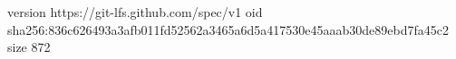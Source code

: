 version https://git-lfs.github.com/spec/v1
oid sha256:836c626493a3afb011fd52562a3465a6d5a417530e45aaab30de89ebd7fa45c2
size 872

